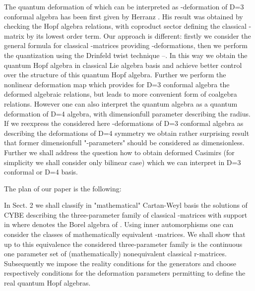 \documentclass[a4paper,12pt,showkeys]{article}
\begin{document}
 The quantum deformation of \coordHE{} which can be interpreted as
 \sloppy \myHighlight{$\kappa$}\coordHE{}-de\-for\-ma\-tion of D=3 conformal algebra has been
 first given
  by Herranz
   \cite{ll8}. His result was obtained by checking the Hopf
   algebra relations, with coproduct sector defining
    the classical \coordHE{}  \coordHE{}-matrix by its  lowest order term.
    Our approach is  different: firstly we consider the general
     formula for classical \coordHE{}   \coordHE{}-matrices
    providing \myHighlight{$\kappa$}\coordHE{}-deformations, then we perform
    the quantization using the Drinfeld twist technique
     \cite{ll9}--\cite{ll11}.
     In this  way we obtain the quantum \coordHE{}  Hopf algebra in
    classical Lie algebra basis and achieve
    better control over the structure of this
    quantum Hopf algebra.
    Further we perform the nonlinear deformation map which provides
     for D=3 conformal algebra
    the deformed algebraic relations,
     but leads to more convenient form of
     coalgebra relations. However one can also interpret the
     quantum algebra \coordHE{} as a quantum deformation of D=4 \coordHE{}
   algebra, with dimensionfull parameter \coordHE{} describing the
   \coordHE{} radius. If we reexpress  the
    considered  here \myHighlight{$\kappa$}\coordHE{}-deformations of D=3 conformal
    algebra as describing the deformations of D=4 \coordHE{}
      symmetry we
    obtain rather surprising
     result that former dimensionfull "\myHighlight{$\kappa$}\coordHE{}-parameters" should
     be considered  as dimensionless.
     Further we shall
     address
    the question
  how to  obtain deformed \coordHE{} Casimirs (for
    simplicity we shall consider only bilinear case) which
     we can interpret in D=3
    conformal or D=4 \coordHE{} basis.


     The plan of our paper is the following:


     In Sect. 2 we shall classify  in "mathematical"
     Cartan-Weyl basis the solutions of CYBE describing
     the three-parameter family of
     classical \coordHE{}-matrices with support in  \coordHE{} where
     \coordHE{} denotes the Borel algebra of \coordHE{}.
    Using inner automorphisms one can consider the classes of
    mathematically equivalent \coordHE{}-matrices. We shall show
    that up to this equivalence the considered three-parameter
    family is the continuous one parameter set of (mathematically)
    nonequivalent classical r-matrices. 
     Subsequently we 
      impose the
    \coordHE{} reality conditions for the generators and choose
    respectively conditions for the deformation parameters
    permitting to define the real \coordHE{} quantum Hopf algebras.
\end{document}
